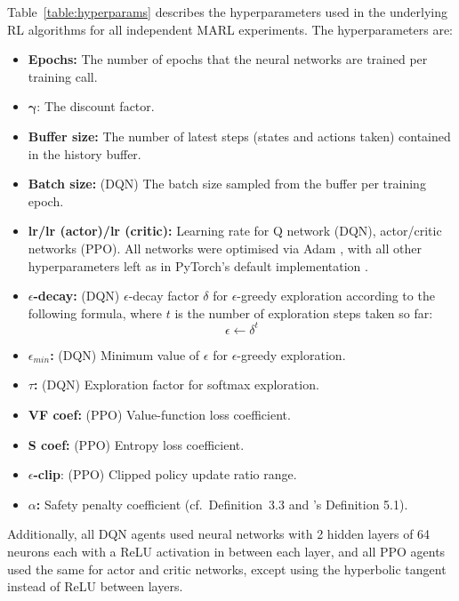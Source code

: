 Table~\ref{table:hyperparams} describes the hyperparameters used in the underlying RL algorithms for all independent MARL experiments. The hyperparameters are:
\begin{itemize}
    \item \textbf{Epochs:} The number of epochs that the neural networks are trained per training call.
    \item {$\mathbf{\gamma}$:} The discount factor.
    \item \textbf{Buffer size:} The number of latest steps (states and actions taken) contained in the history buffer.
    \item \textbf{Batch size:} (DQN) The batch size sampled from the buffer per training epoch.
    \item \textbf{lr/lr (actor)/lr (critic):} Learning rate for Q network (DQN), actor/critic networks (PPO). All networks were optimised via Adam \citep{kingma2014adam}, with all other hyperparameters left as in PyTorch's default implementation \citep{paszke2019pytorch}.
    \item \textbf{$\epsilon$-decay:} (DQN) $\epsilon$-decay factor $\delta$ for $\epsilon$-greedy exploration according to the following formula, where $t$ is the number of exploration steps taken so far:
    \begin{equation}
        \epsilon\leftarrow\delta^t
    \end{equation}
    \item \textbf{$\epsilon_{min}$:} (DQN) Minimum value of $\epsilon$ for $\epsilon$-greedy exploration.
    \item \textbf{$\tau$:} (DQN) Exploration factor for softmax exploration.
    \item \textbf{VF coef:} (PPO) Value-function loss coefficient.
    \item \textbf{S coef:} (PPO) Entropy loss coefficient.
    \item \textbf{$\epsilon$-clip}: (PPO) Clipped policy update ratio range. 
    \item \textbf{$\alpha$:} Safety penalty coefficient (cf.\ Definition~3.3 and \citet{yang2023safe}'s Definition 5.1).
\end{itemize}
Additionally, all DQN agents used neural networks with 2 hidden layers of 64 neurons each with a ReLU activation in between each layer, and all PPO agents used the same for actor and critic networks, except using the hyperbolic tangent instead of ReLU between layers.
